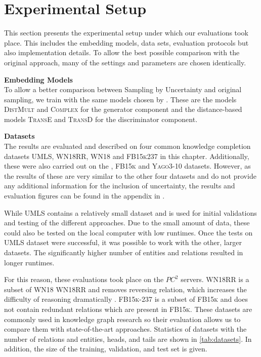 \section{Experimental Setup}
\label{ch:evaluation:sec:experimental_setup}
%
This section presents the experimental setup under which our evaluations took place.
This includes the embedding models, data sets, evaluation protocols but also implementation details.
To allow the best possible comparison with the original \kbgan approach, many of the settings and parameters are chosen identically.

\textbf{Embedding Models}\\
To allow a better comparison between Sampling by Uncertainty and original sampling, we train with the same models chosen by \kbgan.
These are the models \textsc{DistMult} and \textsc{Complex} for the generator component and the distance-based models \textsc{TransE} and \textsc{TransD} for the discriminator component.

\textbf{Datasets}\\
The results are evaluated and described on four common knowledge completion datasets  \textsc{UMLS}, \textsc{WN18RR}, \textsc{WN18} 
and \textsc{FB15k237} in this chapter.
Additionally, these were also carried out on the \kinship, \textsc{FB15k} and \textsc{Yago3-10} datasets.
However, as the results of these are very similar to the other four datasets and do not provide any additional information for the inclusion of uncertainty, the results and evaluation figures can be found in the appendix in .

While \textsc{UMLS} contains a relatively small dataset and is used for initial validations and testing of the different approaches.
Due to the small amount of data, these could also be tested on the local computer with low runtimes.
Once the tests on \textsc{UMLS} dataset were successful, it was possible to work with the other, larger datasets.
The significantly higher number of entities and relations resulted in longer runtimes.

For this reason, these evaluations took place on the $PC^2$ servers.
\textsc{WN18RR} is a subset of \textsc{WN18} \textsc{WN18RR} and removes reversing relation, which increases the difficulty of reasoning dramatically \cite{cai2017kbgan}.
\textsc{FB15k-237} is a subset of \textsc{FB15k} and does not contain redundant relations which are present in \textsc{FB15k}.
These datasets are commonly used in knowledge graph research so their evaluation allows us to compare them with state-of-the-art approaches.
Statistics of datasets with the number of relations and entities, heads, and tails are shown in \autoref{tab:datasets}. 
In addition, the size of the training, validation, and test set is given.
        
